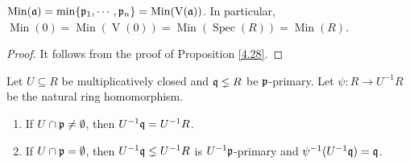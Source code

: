 \begin{proposition}\label{4.36}
    $\operatorname{Min}(\mathfrak{a}) = \min\{\mathfrak{p}_1,\cdots,\mathfrak{p}_n\} = \operatorname{Min}(\operatorname{V}(\mathfrak{a}))$. In particular, $\operatorname{Min}(0) = \operatorname{Min}(\operatorname{V}(0)) = \operatorname{Min}(\operatorname{Spec}(R)) = \operatorname{Min}(R)$.
\end{proposition}

\begin{proof}
    It follows from the proof of Proposition \ref{4.28}.
\end{proof}

\begin{lemma}\label{4.37}
    Let $U \subseteq R$ be multiplicatively closed and $\mathfrak{q} \lneq R$ be $\mathfrak{p}$-primary. Let $\psi: R \to U^{-1}R$ be the natural ring homomorphism.
    \begin{enumerate}
        \item\label{4.37a} If $U \cap \mathfrak{p} \neq \emptyset$, then $U^{-1}\mathfrak{q} = U^{-1}R$.
        \item\label{4.37b} If $U \cap \mathfrak{p} = \emptyset$, then $U^{-1}\mathfrak{q} \lneq U^{-1}R$ is $U^{-1}\mathfrak{p}$-primary and $\psi^{-1}(U^{-1}\mathfrak{q}) = \mathfrak{q}$.
    \end{enumerate}
\end{lemma}

